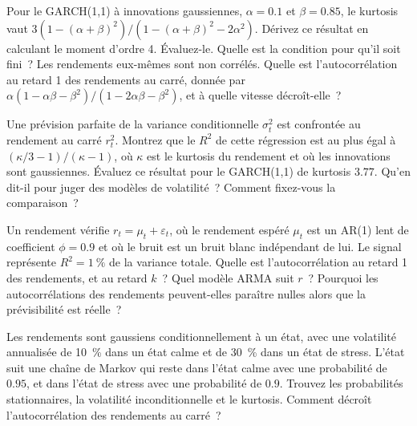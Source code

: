 \begin{question}\label{iq:iv1:time-series:14}
Pour le GARCH(1,1) à innovations gaussiennes, $\alpha = 0.1$ et $\beta = 0.85$, le kurtosis vaut $3(1 - (\alpha + \beta)^2)/(1 - (\alpha + \beta)^2 - 2\alpha^2)$. Dérivez ce résultat en calculant le moment d'ordre 4. Évaluez-le. Quelle est la condition pour qu'il soit fini~? Les rendements eux-mêmes sont non corrélés. Quelle est l'autocorrélation au retard 1 des rendements au carré, donnée par $\alpha(1 - \alpha\beta - \beta^2)/(1 - 2\alpha\beta - \beta^2)$, et à quelle vitesse décroît-elle~?
\end{question}

\begin{question}\label{iq:iv1:time-series:15}
Une prévision parfaite de la variance conditionnelle $\sigma_t^2$ est confrontée au rendement au carré $r_t^2$. Montrez que le $R^2$ de cette régression est au plus égal à $(\kappa/3 - 1)/(\kappa - 1)$, où $\kappa$ est le kurtosis du rendement et où les innovations sont gaussiennes. Évaluez ce résultat pour le GARCH(1,1) de kurtosis $3.77$. Qu'en dit-il pour juger des modèles de volatilité~? Comment fixez-vous la comparaison~?
\end{question}

\begin{question}\label{iq:iv1:time-series:16}
Un rendement vérifie $r_t = \mu_t + \varepsilon_t$, où le rendement espéré $\mu_t$ est un AR(1) lent de coefficient $\phi = 0.9$ et où le bruit est un bruit blanc indépendant de lui. Le signal représente $R^2 = 1~\%$ de la variance totale. Quelle est l'autocorrélation au retard 1 des rendements, et au retard $k$~? Quel modèle ARMA suit $r$~? Pourquoi les autocorrélations des rendements peuvent-elles paraître nulles alors que la prévisibilité est réelle~?
\end{question}

\begin{question}\label{iq:iv1:time-series:17}
Les rendements sont gaussiens conditionnellement à un état, avec une volatilité annualisée de 10~\% dans un état calme et de 30~\% dans un état de stress. L'état suit une chaîne de Markov qui reste dans l'état calme avec une probabilité de $0.95$, et dans l'état de stress avec une probabilité de $0.9$. Trouvez les probabilités stationnaires, la volatilité inconditionnelle et le kurtosis. Comment décroît l'autocorrélation des rendements au carré~?
\end{question}

